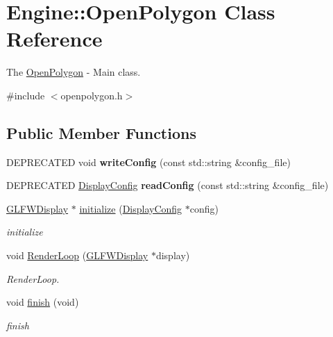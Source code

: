 \hypertarget{classEngine_1_1OpenPolygon}{}\section{Engine\+:\+:Open\+Polygon Class Reference}
\label{classEngine_1_1OpenPolygon}


The \hyperlink{classEngine_1_1OpenPolygon}{Open\+Polygon} -\/ Main class.  




{\ttfamily \#include $<$openpolygon.\+h$>$}

\subsection*{Public Member Functions}
\begin{DoxyCompactItemize}
\item 
\hypertarget{classEngine_1_1OpenPolygon_aad826a86674a3b92d97658ee25ec8f6b}{}D\+E\+P\+R\+E\+C\+A\+T\+E\+D void {\bfseries write\+Config} (const std\+::string \&config\+\_\+file)\label{classEngine_1_1OpenPolygon_aad826a86674a3b92d97658ee25ec8f6b}

\item 
\hypertarget{classEngine_1_1OpenPolygon_a913c5e47d130c6f9960b01db2f31725d}{}D\+E\+P\+R\+E\+C\+A\+T\+E\+D \hyperlink{classEngine_1_1DisplayConfig}{Display\+Config} {\bfseries read\+Config} (const std\+::string \&config\+\_\+file)\label{classEngine_1_1OpenPolygon_a913c5e47d130c6f9960b01db2f31725d}

\item 
\hyperlink{classEngine_1_1GLFWDisplay}{G\+L\+F\+W\+Display} $\ast$ \hyperlink{classEngine_1_1OpenPolygon_adac81701d470c58bbdb3d14c989f1949}{initialize} (\hyperlink{classEngine_1_1DisplayConfig}{Display\+Config} $\ast$config)
\begin{DoxyCompactList}\small\item\em initialize \end{DoxyCompactList}\item 
void \hyperlink{classEngine_1_1OpenPolygon_a9181551ff0eb633b6db245d3463f662d}{Render\+Loop} (\hyperlink{classEngine_1_1GLFWDisplay}{G\+L\+F\+W\+Display} $\ast$display)
\begin{DoxyCompactList}\small\item\em Render\+Loop. \end{DoxyCompactList}\item 
void \hyperlink{classEngine_1_1OpenPolygon_a1c593a74edb697ba54f956b6bde598ed}{finish} (void)
\begin{DoxyCompactList}\small\item\em finish \end{DoxyCompactList}\end{DoxyCompactItemize}


